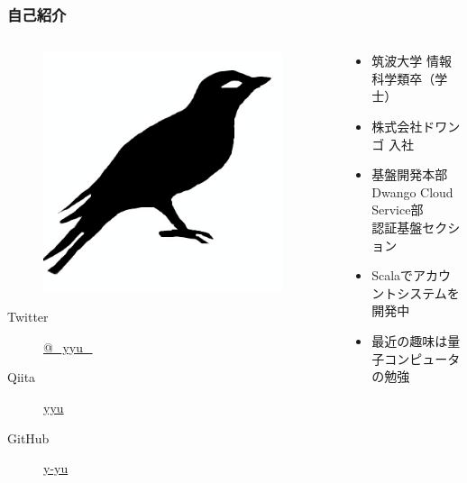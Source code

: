 \begin{frame}
  \frametitle{自己紹介}
  
  \begin{columns}
    \begin{column}{0.3\textwidth}
      \centering
      \begin{figure}
        \includegraphics[width=0.95\textwidth]{img/bird2x.png}
      \end{figure}

      \begin{description}
        \item[Twitter] \href{https://twitter.com/\_yyu\_}{@\_yyu\_}
        \item[Qiita] \href{http://qiita.com/yyu}{yyu}
        \item[GitHub] \href{https://github.com/y-yu}{y-yu}
      \end{description}
    \end{column}
    \begin{column}{0.7\textwidth}
      \begin{itemize}
        \item<2-> 筑波大学 情報科学類卒（学士）
        \item<3-> 株式会社ドワンゴ 入社
        \item<4-> 基盤開発本部 Dwango Cloud Service部\\
        認証基盤セクション
        \item<5-> Scalaでアカウントシステムを開発中
        \item<6-> 最近の趣味は量子コンピュータの勉強
      \end{itemize}
    \end{column}
  \end{columns}
\end{frame}

